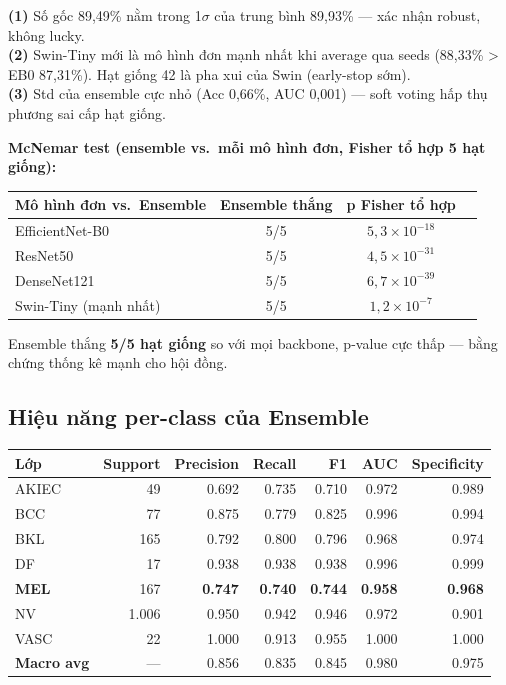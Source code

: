 \documentclass[11pt,a4paper]{article}
\begin{document}
\begin{idea}
\textbf{(1)} Số gốc 89,49\% nằm trong 1$\sigma$ của trung bình 89,93\% --- xác nhận robust, không lucky.\\
\textbf{(2)} Swin-Tiny mới là mô hình đơn mạnh nhất khi average qua seeds (88,33\% > EB0 87,31\%). Hạt giống 42 là pha xui của Swin (early-stop sớm).\\
\textbf{(3)} Std của ensemble cực nhỏ (Acc 0,66\%, AUC 0,001) --- soft voting hấp thụ phương sai cấp hạt giống.
\end{idea}

\textbf{McNemar test (ensemble vs.\ mỗi mô hình đơn, Fisher tổ hợp 5 hạt giống):}

\begin{table}[h]
\centering\small
\begin{tabular}{lccc}
\toprule
\textbf{Mô hình đơn vs.\ Ensemble} & \textbf{Ensemble thắng} & \textbf{p Fisher tổ hợp} \\
\midrule
EfficientNet-B0 & 5/5 & $5{,}3 \times 10^{-18}$ \\
ResNet50        & 5/5 & $4{,}5 \times 10^{-31}$ \\
DenseNet121     & 5/5 & $6{,}7 \times 10^{-39}$ \\
Swin-Tiny (mạnh nhất) & 5/5 & $1{,}2 \times 10^{-7}$ \\
\bottomrule
\end{tabular}
\end{table}

Ensemble thắng \textbf{5/5 hạt giống} so với mọi backbone, p-value cực thấp --- bằng chứng thống kê mạnh cho hội đồng.

\subsection{Hiệu năng per-class của Ensemble}

\begin{table}[h]
\centering\small
\begin{tabular}{lrrrrrr}
\toprule
\textbf{Lớp} & \textbf{Support} & \textbf{Precision} & \textbf{Recall} & \textbf{F1} & \textbf{AUC} & \textbf{Specificity} \\
\midrule
AKIEC &   49 & 0.692 & 0.735 & 0.710 & 0.972 & 0.989 \\
BCC   &   77 & 0.875 & 0.779 & 0.825 & 0.996 & 0.994 \\
BKL   &  165 & 0.792 & 0.800 & 0.796 & 0.968 & 0.974 \\
DF    &   17 & 0.938 & 0.938 & 0.938 & 0.996 & 0.999 \\
\textbf{MEL} &  167 & \textbf{0.747} & \textbf{0.740} & \textbf{0.744} & \textbf{0.958} & \textbf{0.968} \\
NV    & 1.006 & 0.950 & 0.942 & 0.946 & 0.972 & 0.901 \\
VASC  &   22 & 1.000 & 0.913 & 0.955 & 1.000 & 1.000 \\
\midrule
\textbf{Macro avg} & --- & 0.856 & 0.835 & 0.845 & 0.980 & 0.975 \\
\bottomrule
\end{tabular}
\end{table}
\end{document}
